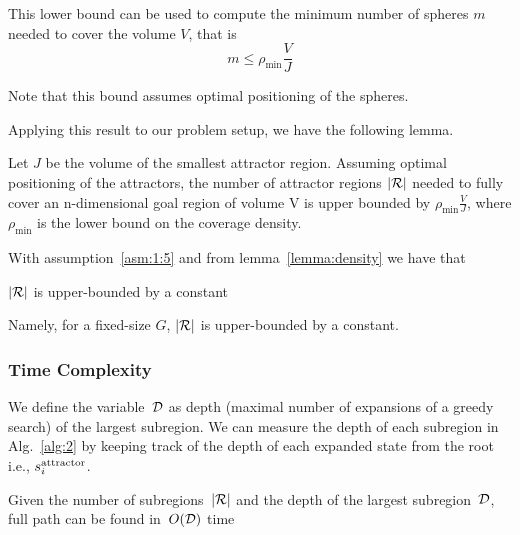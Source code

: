 \documentclass[a4paper]{report}
\begin{document}
This lower bound can be used to compute the minimum number of spheres $m$ needed to cover the volume $V$, that is
$$
m \leq \rho_{\textrm{min}}\frac{V}{J}
$$

Note that this bound assumes optimal positioning of the spheres.

Applying this result to our problem setup, we have the following lemma.

\vspace{2mm}
\begin{lemma}
\label{lemma:density}
Let $J$ be the volume of the smallest attractor region. Assuming optimal positioning of the attractors, the number of attractor regions $|\mathcal{R}|$ needed to fully cover an n-dimensional goal region of volume V is upper bounded by $\rho_{\textrm{min}} \frac{V}{J}$, where $\rho_{\textrm{min}}$ is the lower bound on the coverage density.
\end{lemma}

With assumption~\ref{asm:1:5} and from lemma~\ref{lemma:density} we have that

\vspace{2mm}
\begin{lemma}
\label{lemma:upper_bound}
$|\mathcal{R}|$ is upper-bounded by a constant
\end{lemma} 

Namely, for a fixed-size $G$, $|\mathcal{R}|$ is upper-bounded by a constant.

\label{subsec:complexity}
\subsubsection{Time Complexity}
We define the variable~$\mathcal{D}$ as depth (maximal number of expansions of a greedy search) of the largest subregion. We can measure the depth of each subregion in Alg.~\ref{alg:2} by keeping track of the depth of each expanded state from the root i.e., $s^{\text{attractor}}_i$.
%
\vspace{2mm}
\begin{lemma}
\label{lemma:unboundedD}
Given the number of subregions~$|\mathcal{R}|$ and the depth of the largest subregion~$\mathcal{D}$, full path can be found in~$O(\mathcal{D})$ time
\end{lemma}
\end{document}
